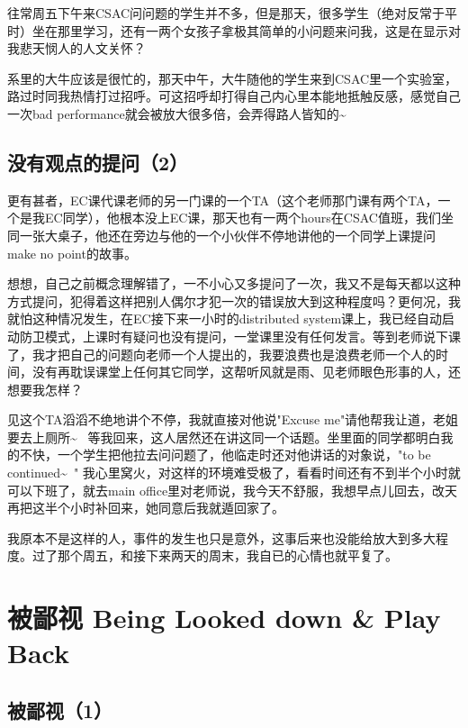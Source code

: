 \documentclass[12pt]{book}
\begin{document}
往常周五下午来CSAC问问题的学生并不多，但是那天，很多学生（绝对反常于平时）坐在那里学习，还有一两个女孩子拿极其简单的小问题来问我，这是在显示对我悲天悯人的人文关怀？

系里的大牛应该是很忙的，那天中午，大牛随他的学生来到CSAC里一个实验室，路过时同我热情打过招呼。可这招呼却打得自己内心里本能地抵触反感，感觉自己一次bad performance就会被放大很多倍，会弄得路人皆知的\textasciitilde{}~

\section{没有观点的提问（2）}
\label{sec-25-2}

更有甚者，EC课代课老师的另一门课的一个TA（这个老师那门课有两个TA，一个是我EC同学），他根本没上EC课，那天也有一两个hours在CSAC值班，我们坐同一张大桌子，他还在旁边与他的一个小伙伴不停地讲他的一个同学上课提问make no point的故事。

想想，自己之前概念理解错了，一不小心又多提问了一次，我又不是每天都以这种方式提问，犯得着这样把别人偶尔才犯一次的错误放大到这种程度吗？更何况，我就怕这种情况发生，在EC接下来一小时的distributed system课上，我已经自动启动防卫模式，上课时有疑问也没有提问，一堂课里没有任何发言。等到老师说下课了，我才把自己的问题向老师一个人提出的，我要浪费也是浪费老师一个人的时间，没有再耽误课堂上任何其它同学，这帮听风就是雨、见老师眼色形事的人，还想要我怎样？

见这个TA滔滔不绝地讲个不停，我就直接对他说"Excuse me"请他帮我让道，老姐要去上厕所\textasciitilde{}~ 等我回来，这人居然还在讲这同一个话题。坐里面的同学都明白我的不快，一个学生把他拉去问问题了，他临走时还对他讲话的对象说，"to be continued\textasciitilde{}~" 我心里窝火，对这样的环境难受极了，看看时间还有不到半个小时就可以下班了，就去main office里对老师说，我今天不舒服，我想早点儿回去，改天再把这半个小时补回来，她同意后我就遁回家了。

我原本不是这样的人，事件的发生也只是意外，这事后来也没能给放大到多大程度。过了那个周五，和接下来两天的周末，我自已的心情也就平复了。

\chapter{被鄙视 Being Looked down \& Play Back}
\label{sec-26}

\section{被鄙视（1）}
\label{sec-26-1}
\end{document}
